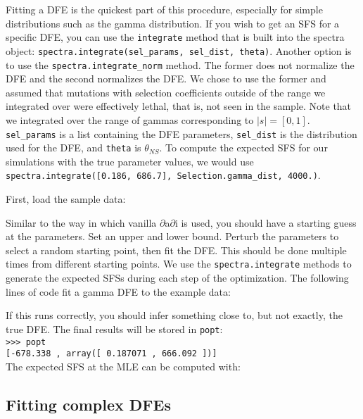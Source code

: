 \documentclass[11pt]{article}
\begin{document}
Fitting a DFE is the quickest part of this procedure, especially for simple distributions such as the gamma distribution. If you wish to get an SFS for a specific DFE, you can use the \texttt{integrate} method that is built into the spectra object: \texttt{spectra.integrate(sel\_params, sel\_dist, theta)}. Another option is to use the \texttt{spectra.integrate\_norm} method. The former does not normalize the DFE and the second normalizes the DFE. We chose to use the former and assumed that mutations with selection coefficients outside of the range we integrated over were effectively lethal, that is, not seen in the sample. Note that we integrated over the range of gammas corresponding to $|s| = [0,1]$. \texttt{sel\_params} is a list containing the DFE parameters, \texttt{sel\_dist} is the distribution used for the DFE, and \texttt{theta} is $\theta_{NS}$. To compute the expected SFS for our simulations with the true parameter values, we would use \texttt{spectra.integrate([0.186, 686.7], Selection.gamma\_dist, 4000.)}.

First, load the sample data:



Similar to the way in which vanilla $\partial$a$\partial$i is used, you should have a starting guess at the parameters. Set an upper and lower bound. Perturb the parameters to select a random starting point, then fit the DFE. This should be done multiple times from different starting points. We use the \texttt{spectra.integrate} methods to generate the expected SFSs during each step of the optimization. The following lines of code fit a gamma DFE to the example data:



If this runs correctly, you should infer something close to, but not exactly, the true DFE. The final results will be stored in \texttt{popt}: \\

\texttt{>>> popt} \\
\texttt{[-678.338    , array([ 0.187071   ,  666.092    ])]} \\

The expected SFS at the MLE can be computed with:



\subsection{Fitting complex DFEs}
\end{document}
